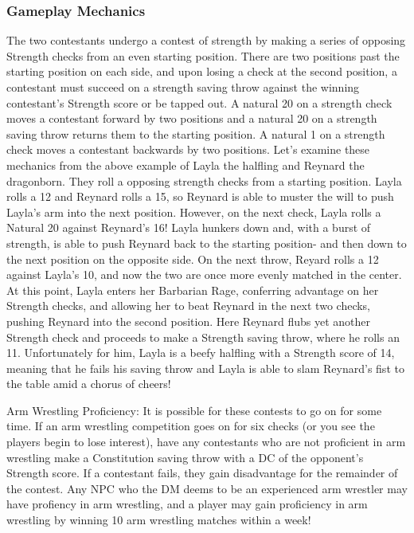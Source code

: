 \documentclass[10pt,a4paper,twoside,twocolumn,openany,nodeprecatedcode]{dndarticle}
\begin{document}
\subsubsection{Gameplay Mechanics}
The two contestants undergo a contest of strength by making a series of opposing Strength checks from an even starting position. There are two positions past the starting position on each side, and upon losing a check at the second position, a contestant must succeed on a strength saving throw against the winning contestant's Strength score or be tapped out.
A natural 20 on a strength check moves a contestant forward by two positions and a natural 20 on a strength saving throw returns them to the starting position. A natural 1 on a strength check moves a contestant backwards by two positions.
Let's examine these mechanics from the above example of Layla the halfling and Reynard the dragonborn. They roll a opposing strength checks from a starting position. Layla rolls a 12 and Reynard rolls a 15, so Reynard is able to muster the will to push Layla's arm into the next position. However, on the next check, Layla rolls a Natural 20 against Reynard's 16! Layla hunkers down and, with a burst of strength, is able to push Reynard back to the starting position- and then down to the next position on the opposite side. On the next throw, Reyard rolls a 12 against Layla's 10, and now the two are once more evenly matched in the center. At this point, Layla enters her Barbarian Rage, conferring advantage on her Strength checks, and allowing her to beat Reynard in the next two checks, pushing Reynard into the second position. Here Reynard flubs yet another Strength check and proceeds to make a Strength saving throw, where he rolls an 11. Unfortunately for him, Layla is a beefy halfling with a Strength score of 14, meaning that he fails his saving throw and Layla is able to slam Reynard's fist to the table amid a chorus of cheers!
\begin{DndComment}{Arm Wrestling Proficiency:}
It is possible for these contests to go on for some time. If an arm wrestling competition goes on for six checks (or you see the players begin to lose interest), have any contestants who are not proficient in arm wrestling make a Constitution saving throw with a DC of the opponent's Strength score. If a contestant fails, they gain disadvantage for the remainder of the contest. Any NPC who the DM deems to be an experienced arm wrestler may have profiency in arm wrestling, and a player may gain proficiency in arm wrestling by winning 10 arm wrestling matches within a week!
\end{DndComment}
\end{document}
